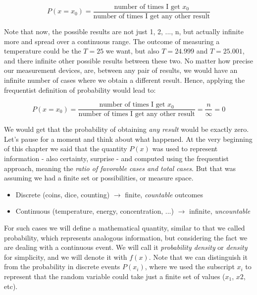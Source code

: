 \documentclass{book}
\begin{document}
\begin{equation}
P(x = x_{0}) = \frac{\text{number of times I get $x_{0}$}}{\text{number of times I get any other result}}
\end{equation}

Note that now, the possible results are not just 1, 2, ..., n, but actually infinite more and spread over a continuous range. The outcome of measuring a temperature could be the $T = 25$ we want, but also $T = 24.999$ and $T = 25.001$, and there infinite other possible results between these two. No matter how precise our measurement devices, are, between any pair of results, we would have an infinite number of cases where we obtain a different result. Hence, applying the frequentist definition of probability would lead to:

\begin{equation}
P(x = x_{0}) = \frac{\text{number of times I get $x_{0}$}}{\text{number of times I get any other result}} = \frac{n}{\infty} = 0
\end{equation}

We would get that the probability of obtaining \textit{any result} would be exactly zero.\\

Let's pause for a moment and think about what happened. At the very beginning of this chapter we said that the quantity $P(x)$ was used to represent information - also certainty, surprise - and computed using the frequentist approach, meaning the \textit{ratio of favorable cases and total cases}. But that was assuming we had a finite set or possibilities, or measure space.

\begin{itemize}
\item Discrete (coins, dice, counting) $\longrightarrow$ finite, \textit{countable} outcomes
\item Continuous (temperature, energy, concentration, ...) $\longrightarrow$ infinite, \textit{uncountable}
\end{itemize}

For such cases we will define a mathematical quantity, similar to that we called probability, which represents analogous information, but considering the fact we are dealing with a continuous event. We will call it \textit{probability density} or \textit{density} for simplicity, and we will denote it with $f(x)$. Note that we can distinguish it from the probability in discrete events $P(x_{i})$, where we used the subscript $x_{i}$ to represent that the random variable could take just a finite set of values ($x_{1}$, $x{2}$, etc).
\end{document}

